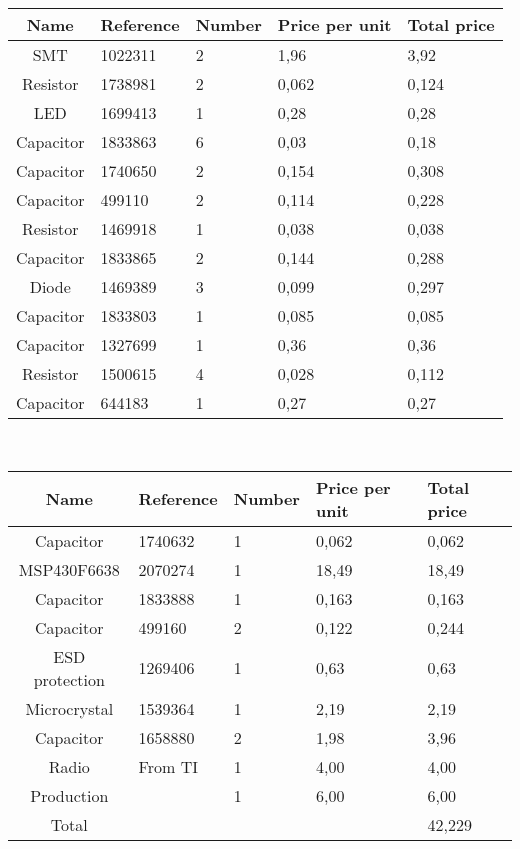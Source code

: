\begin{tabular}{| c |l | l | l | l |} 
	\hline
		Name & Reference & Number & Price per unit & Total price\\ \hline
		SMT & 1022311 & 2 & 1,96 & 3,92\\ \hline
		Resistor & 1738981 & 2 & 0,062 & 0,124\\ \hline
		LED & 1699413 & 1 & 0,28 & 0,28\\ \hline
		Capacitor & 1833863 & 6 & 0,03 & 0,18\\ \hline
		Capacitor & 1740650 & 2 & 0,154 & 0,308\\ \hline
		Capacitor & 499110 & 2 & 0,114 & 0,228\\ \hline
		Resistor & 1469918 & 1 & 0,038 & 0,038\\ \hline
		Capacitor & 1833865 & 2 & 0,144 & 0,288\\ \hline
		Diode & 1469389 & 3 & 0,099 & 0,297\\ \hline
	   	Capacitor & 1833803 & 1 & 0,085 & 0,085\\ \hline
 		Capacitor & 1327699 & 1 & 0,36 & 0,36 \\ \hline
  		Resistor & 1500615 & 4 & 0,028 & 0,112\\ \hline
	 	Capacitor & 644183 & 1 & 0,27 & 0,27 \\ \hline
\end{tabular}\\
\begin{tabular}{| c |l | l | l | l |} 
		\hline
		Name & Reference & Number & Price per unit & Total price\\ \hline
	 	Capacitor & 1740632 & 1 & 0,062 & 0,062\\ \hline
	 	MSP430F6638 & 2070274 & 1 & 18,49 & 18,49\\ \hline
	 	Capacitor & 1833888 & 1 & 0,163 & 0,163\\ \hline
	 	Capacitor & 499160 & 2 & 0,122 & 0,244\\ \hline
	 	ESD protection & 1269406 & 1 & 0,63 & 0,63\\ \hline
	 	Microcrystal & 1539364 & 1 & 2,19 & 2,19\\ \hline
	 	Capacitor & 1658880 & 2 & 1,98 & 3,96\\ \hline
	 	Radio & From TI & 1 & 4,00 & 4,00\\ \hline
		Production & & 1 & 6,00 & 6,00\\ \hline
	 	Total &  &  &  & 42,229\\ \hline
\end{tabular}\\

